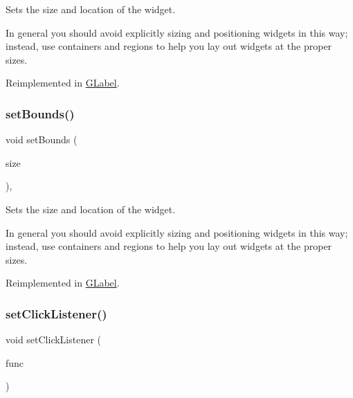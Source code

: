 Sets the size and location of the widget. 

In general you should avoid explicitly sizing and positioning widgets in this way; instead, use containers and regions to help you lay out widgets at the proper sizes. 

Reimplemented in \mbox{\hyperlink{classGLabel_aab3121dc97f8c5c1ddee39ea81d08509}{G\+Label}}.

\mbox{\label{classGInteractor_acada386653f008cacc7cce86426bef7c}} 
\subsubsection{\texorpdfstring{set\+Bounds()}{setBounds()}\hspace{0.1cm}{\footnotesize\ttfamily [2/2]}}
{\footnotesize\ttfamily void set\+Bounds (\begin{DoxyParamCaption}\item[{const \mbox{\hyperlink{classGRectangle}{G\+Rectangle}} \&}]{size }\end{DoxyParamCaption})\hspace{0.3cm}{\ttfamily [virtual]}, {\ttfamily [inherited]}}



Sets the size and location of the widget. 

In general you should avoid explicitly sizing and positioning widgets in this way; instead, use containers and regions to help you lay out widgets at the proper sizes. 

Reimplemented in \mbox{\hyperlink{classGLabel_a3ed96c7e7adaf111848a90978621066c}{G\+Label}}.

\mbox{\label{classGCanvas_abd40af6921242584d0954f173911b190}} 
\subsubsection{\texorpdfstring{set\+Click\+Listener()}{setClickListener()}\hspace{0.1cm}{\footnotesize\ttfamily [1/2]}}
{\footnotesize\ttfamily void set\+Click\+Listener (\begin{DoxyParamCaption}\item[{G\+Event\+Listener}]{func }\end{DoxyParamCaption})\hspace{0.3cm}{\ttfamily [virtual]}}




